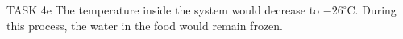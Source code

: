 TASK 4e  
The temperature inside the system would decrease to \(-26^\circ\text{C}\). During this process, the water in the food would remain frozen.